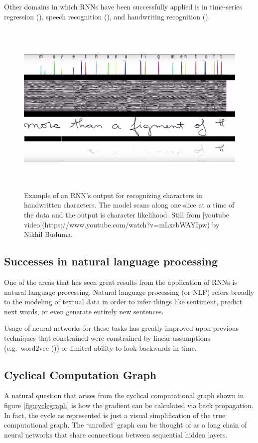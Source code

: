 \documentclass[]{book}
\theoremstyle{definition}
\theoremstyle{definition}
\theoremstyle{definition}
\theoremstyle{remark}
\begin{document}
Other domains in which RNNs have been successfully applied is in
time-series regression (\citet{rnn_regression}), speech recognition
(\citet{rnn_speach}), and handwriting recognition
(\citet{rnn_handwriting}).

\begin{figure}
\includegraphics[height=320]{figures/handwriting_rnn} \caption{Example of an RNN's output for recognizing characters in handwritten characters. The model scans along one slice at a time of the data and the output is character likelihood. Still from [youtube video](https://www.youtube.com/watch?v=mLxsbWAYIpw) by Nikhil Buduma.}\label{fig:unnamed-chunk-5}
\end{figure}

\subsection{Successes in natural language
processing}\label{successes-in-natural-language-processing}

One of the areas that has seen great results from the application of
RNNs is natural language processing. Natural language processing (or
NLP) refers broadly to the modeling of textual data in order to infer
things like sentiment, predict next words, or even generate entirely new
sentences.

Usage of neural networks for these tasks has greatly improved upon
previous techniques that constrained were constrained by linear
assumptions (e.g.~word2vec (\citet{word2vec})) or limited ability to
look backwards in time.

\subsection{Cyclical Computation
Graph}\label{cyclical-computation-graph}

A natural question that arises from the cyclical computational graph
shown in figure \ref{fig:cyclegraph} is how the gradient can be
calculated via back propagation. In fact, the cycle as represented is
just a visual simplification of the true computational graph. The
`unrolled' graph can be thought of as a long chain of neural networks
that share connections between sequential hidden layers.
\end{document}
